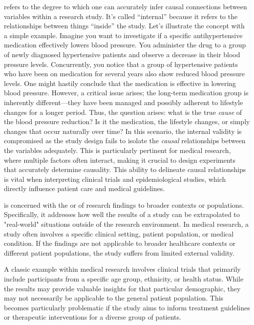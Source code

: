  refers to the degree to which one can accurately infer causal connections between variables within a research study. It's called ``internal'' because it refers to the relationships between things ``inside'' the study. Let's illustrate the concept with a simple example. Imagine you want to investigate if a specific antihypertensive medication effectively lowers blood pressure. You administer the drug to a group of newly diagnosed hypertensive patients and observe a decrease in their blood pressure levels. Concurrently, you notice that a group of hypertensive patients who have been on medication for several years also show reduced blood pressure levels. One might hastily conclude that the medication is effective in lowering blood pressure. However, a critical issue arises; the long-term medication group is inherently different—they have been managed and possibly adherent to lifestyle changes for a longer period. Thus, the question arises: what is the true \textit{cause} of the blood pressure reduction? Is it the medication, the lifestyle changes, or simply changes that occur naturally over time? In this scenario, the internal validity is compromised as the study design fails to isolate the \textit{causal} relationships between the variables adequately. This is particularly pertinent for medical research, where multiple factors often interact, making it crucial to design experiments that accurately determine causality. This ability to delineate causal relationships is vital when interpreting clinical trials and epidemiological studies, which directly influence patient care and medical guidelines.



 is concerned with the  or  of research findings to broader contexts or populations. Specifically, it addresses how well the results of a study can be extrapolated to "real-world" situations outside of the research environment. In medical research, a study often involves a specific clinical setting, patient population, or medical condition. If the findings are not applicable to broader healthcare contexts or different patient populations, the study suffers from limited external validity.

A classic example within medical research involves clinical trials that primarily include participants from a specific age group, ethnicity, or health status. While the results may provide valuable insights for that particular demographic, they may not necessarily be applicable to the general patient population. This becomes particularly problematic if the study aims to inform treatment guidelines or therapeutic interventions for a diverse group of patients.


